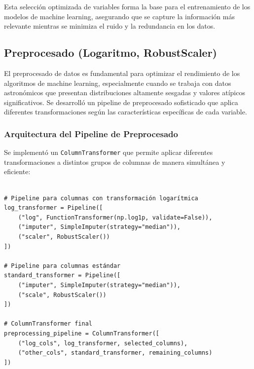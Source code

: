 \documentclass{article}
\begin{document}

Esta selección optimizada de variables forma la base para el entrenamiento de los modelos de machine learning, asegurando que se capture la información más relevante mientras se minimiza el ruido y la redundancia en los datos.

\subsection{Preprocesado (Logaritmo, RobustScaler)}

El preprocesado de datos es fundamental para optimizar el rendimiento de los algoritmos de machine learning, especialmente cuando se trabaja con datos astronómicos que presentan distribuciones altamente sesgadas y valores atípicos significativos. Se desarrolló un pipeline de preprocesado sofisticado que aplica diferentes transformaciones según las características específicas de cada variable.

\subsubsection{Arquitectura del Pipeline de Preprocesado}

Se implementó un \texttt{ColumnTransformer} que permite aplicar diferentes transformaciones a distintos grupos de columnas de manera simultánea y eficiente:

\begin{verbatim}

# Pipeline para columnas con transformación logarítmica
log_transformer = Pipeline([
    ("log", FunctionTransformer(np.log1p, validate=False)),
    ("imputer", SimpleImputer(strategy="median")),
    ("scaler", RobustScaler())
])

# Pipeline para columnas estándar
standard_transformer = Pipeline([
    ("imputer", SimpleImputer(strategy="median")),
    ("scale", RobustScaler())
])

# ColumnTransformer final
preprocessing_pipeline = ColumnTransformer([
    ("log_cols", log_transformer, selected_columns),
    ("other_cols", standard_transformer, remaining_columns)
])
\end{verbatim}
\end{document}
